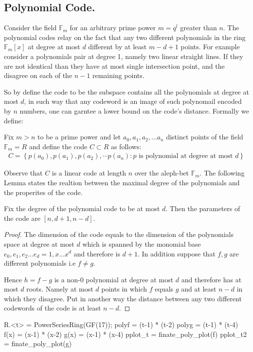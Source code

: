 \subsection{Polynomial Code.} Consider the field $\mathbb{F}_{m}$ for an arbitrary prime power $m=q^{l}$ greater than $n$. The polynomial codes relay on the fact that any two different polynomials in the ring $\mathbb{F}_{m}\left[ x \right]$ at degree at most $d$ different by at least $m - d + 1$ points. For example consider a polynomials pair at degree 1, namely two linear straight lines. If they are not identical than they have at most single intersection point, and the disagree on each of the $n-1$ remaining points.  

So by define the code to be the subspace contains all the polynomials at degree at most $d$, in such way that any codeword is an image of such polynomail encoded by $n$ numbers, one can garntee a lower bound on the code's distance. Formally we define:     
\begin{definition}
  Fix $m > n $ to be a prime power and let $a_{0},a_{1},a_{2},\ldots a_{n}$ distinct points of the field $\mathbb{F}_{m} = R$  and define the code $C \subset R $ as follows:  
  \begin{equation*}
    \begin{split}
      C = \left\{p\left(a_{0}\right),p\left(a_{1}\right),p\left(a_{2}\right),\cdots p\left(a_{n}\right) : p \text{ is polynomial at degree at most } d \right\}
    \end{split}
  \end{equation*}
\end{definition}
Observe that $C$ is a linear code at length $n$ over the aleph-bet $\mathbb{F}_{m}$. The following Lemma states the realtion between the maximal degree of the polynomials and the properites of the code.   
\begin{lemma}
  Fix the degree of the polynomial code to be at most $d$. Then the parameters of the code are $[n,d + 1, n - d]$.  
  \label{polycode}
\end{lemma}
\begin{proof}
  The dimension of the code equals to the dimension of the polynomials space at degree at most $d$ which is spanned by the monomial base $e_{0}, e_{1}, e_{2} ... e_{d} = 1, x ... x^{d}$ and therefore is $d+1$. In addition suppose that $f,g$ are different polynomials i.e $f\neq g$.

  Hence $h = f-g$ is a non-$0$ polynomial at degree at most $d$ and therefore has at most $d$ roots. Namely at most $d$ points in which $f$ equals $g$ and at least $n-d$ in which they disagree. Put in another way the distance between any two different codewords of the code is at least $n-d$.  
\end{proof}
\begin{sagesilent}
R.<t> = PowerSeriesRing(GF(17));
polyf = (t-1) * (t-2)
polyg = (t-1) * (t-4)
f(x) = (x-1) * (x-2)
g(x) = (x-1) * (x-4)
pplot_t = finate_poly_plot(f)
pplot_t2 = finate_poly_plot(g)



\end{sagesilent}
 
